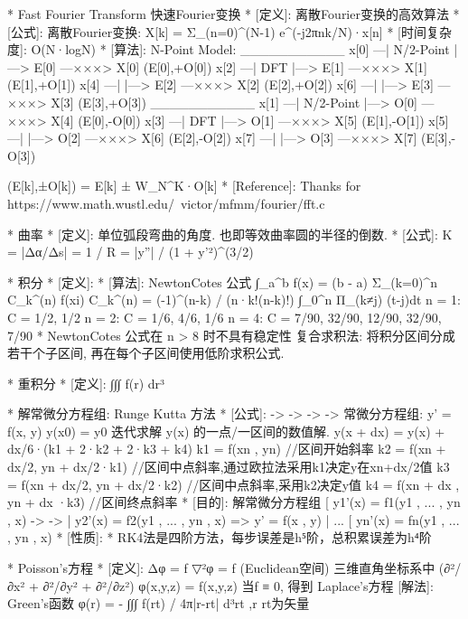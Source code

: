 *					Fast Fourier Transform 快速Fourier变换
*	[定义]: 离散Fourier变换的高效算法
*	[公式]:
		离散Fourier变换: X[k] = Σ_(n=0)^(N-1)  e^(-j2πnk/N)·x[n]
*	[时间复杂度]: O(N·logN)
*	[算法]:
		N-Point Model:
				___________
		x[0] —| N/2-Point |—> E[0] —×××> X[0]  (E[0],+O[0])
		x[2] —|   DFT	   |—> E[1] —×××> X[1]  (E[1],+O[1])
		x[4] —|		   |—> E[2] —×××> X[2]  (E[2],+O[2])
		x[6] —|		   |—> E[3] —×××> X[3]  (E[3],+O[3])
                ___________
		x[1] —| N/2-Point |—> O[0] —×××> X[4]  (E[0],-O[0])
		x[3] —|   DFT	   |—> O[1] —×××> X[5]  (E[1],-O[1])
		x[5] —|		   |—> O[2] —×××> X[6]  (E[2],-O[2])
		x[7] —|		   |—> O[3] —×××> X[7]  (E[3],-O[3])

		(E[k],±O[k]) = E[k] ± W_N^K·O[k]
*	[Reference]:
		Thanks for https://www.math.wustl.edu/~victor/mfmm/fourier/fft.c


*                    曲率
*	[定义]: 单位弧段弯曲的角度. 也即等效曲率圆的半径的倒数.
*	[公式]: K = |Δα/Δs| = 1 / R = |y''| / (1 + y'²)^(3/2)


    *                    积分
    *	[定义]:
    *	[算法]: NewtonCotes 公式
            ∫_a^b f(x) = (b - a) Σ_(k=0)^n  C_k^(n) f(xi)
            C_k^(n) = (-1)^(n-k) / (n·k!(n-k)!) ∫_0^n Π_(k≠j) (t-j)dt 
            n = 1: C = {1/2, 1/2}
            n = 2: C = {1/6, 4/6, 1/6}
            n = 4: C = {7/90, 32/90, 12/90, 32/90, 7/90}
            * NewtonCotes 公式在 n > 8 时不具有稳定性
            复合求积法: 将积分区间分成若干个子区间, 再在每个子区间使用低阶求积公式.


*                    重积分
*	[定义]: ∫∫∫ f(r) dr³


*                    解常微分方程组: Runge Kutta 方法
*	[公式]:           ->   ->       ->      ->
		常微分方程组: y' = f(x, y)	y(x0) = y0
		迭代求解 \vec y(x) 的一点/一区间的数值解.
		y(x + dx) = y(x) + dx/6·(k1 + 2·k2 + 2·k3 + k4)
		k1 = f(xn , yn)						//区间开始斜率
		k2 = f(xn + dx/2, yn + dx/2·k1)	//区间中点斜率,通过欧拉法采用k1决定y在xn+dx/2值
		k3 = f(xn + dx/2, yn + dx/2·k2)	//区间中点斜率,采用k2决定y值
		k4 = f(xn + dx	, yn + dx  ·k3)	//区间终点斜率
*	[目的]: 解常微分方程组
		[ y1'(x) = f1(y1 , ... , yn , x)          ->   ->
		| y2'(x) = f2(y1 , ... , yn , x)    =>    y' = f(x , y)
		| ...
		[ yn'(x) = fn(y1 , ... , yn , x)
*	[性质]:
		* RK4法是四阶方法，每步误差是h⁵阶，总积累误差为h⁴阶


*                    Poisson's方程
*	[定义]: Δφ = f
			▽²φ = f  (Euclidean空间)
		三维直角坐标系中 (∂²/∂x² + ∂²/∂y² + ∂²/∂z²) φ(x,y,z) = f(x,y,z)
		当f ≡ 0, 得到 Laplace's方程
	[解法]:  Green's函数  φ(r) = - ∫∫∫ f(rt) / 4π|r-rt| d³rt    ,r rt为矢量


